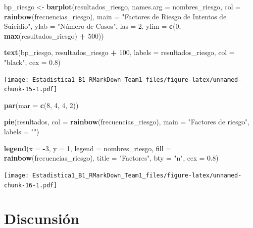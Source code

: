 \documentclass[
]{article}
\newenvironment{Shaded}{\begin{snugshade}}{\end{snugshade}}
\newcommand{\AttributeTok}[1]{\textcolor[rgb]{0.13,0.29,0.53}{#1}}
\newcommand{\DecValTok}[1]{\textcolor[rgb]{0.00,0.00,0.81}{#1}}
\newcommand{\FloatTok}[1]{\textcolor[rgb]{0.00,0.00,0.81}{#1}}
\newcommand{\FunctionTok}[1]{\textcolor[rgb]{0.13,0.29,0.53}{\textbf{#1}}}
\newcommand{\NormalTok}[1]{#1}
\newcommand{\OtherTok}[1]{\textcolor[rgb]{0.56,0.35,0.01}{#1}}
\newcommand{\SpecialCharTok}[1]{\textcolor[rgb]{0.81,0.36,0.00}{\textbf{#1}}}
\newcommand{\StringTok}[1]{\textcolor[rgb]{0.31,0.60,0.02}{#1}}
\begin{document}
\begin{Shaded}
\begin{Highlighting}[]
\NormalTok{bp\_riesgo }\OtherTok{\textless{}{-}} \FunctionTok{barplot}\NormalTok{(resultados\_riesgo, }\AttributeTok{names.arg =}\NormalTok{ nombres\_riesgo, }\AttributeTok{col =} \FunctionTok{rainbow}\NormalTok{(frecuencias\_riesgo), }\AttributeTok{main =} \StringTok{"Factores de Riesgo de Intentos de Suicidio"}\NormalTok{, }\AttributeTok{ylab =} \StringTok{"Número de Casos"}\NormalTok{, }\AttributeTok{las =} \DecValTok{2}\NormalTok{, }\AttributeTok{ylim =} \FunctionTok{c}\NormalTok{(}\DecValTok{0}\NormalTok{, }\FunctionTok{max}\NormalTok{(resultados\_riesgo) }\SpecialCharTok{+} \DecValTok{500}\NormalTok{))}

\FunctionTok{text}\NormalTok{(bp\_riesgo, resultados\_riesgo }\SpecialCharTok{+} \DecValTok{100}\NormalTok{, }\AttributeTok{labels =}\NormalTok{ resultados\_riesgo, }\AttributeTok{col =} \StringTok{"black"}\NormalTok{, }\AttributeTok{cex =} \FloatTok{0.8}\NormalTok{)}
\end{Highlighting}
\end{Shaded}

\texttt{[image: Estadistica1\_B1\_RMarkDown\_Team1\_files/figure-latex/unnamed-chunk-15-1.pdf]}

\begin{Shaded}
\begin{Highlighting}[]
\FunctionTok{par}\NormalTok{(}\AttributeTok{mar =} \FunctionTok{c}\NormalTok{(}\DecValTok{8}\NormalTok{, }\DecValTok{4}\NormalTok{, }\DecValTok{4}\NormalTok{, }\DecValTok{2}\NormalTok{))}

\FunctionTok{pie}\NormalTok{(resultados, }\AttributeTok{col =} \FunctionTok{rainbow}\NormalTok{(frecuencias\_riesgo), }\AttributeTok{main =} \StringTok{"Factores de riesgo"}\NormalTok{, }\AttributeTok{labels =} \StringTok{""}\NormalTok{)}

\FunctionTok{legend}\NormalTok{(}\AttributeTok{x =} \SpecialCharTok{{-}}\DecValTok{3}\NormalTok{, }\AttributeTok{y =} \DecValTok{1}\NormalTok{, }\AttributeTok{legend =}\NormalTok{ nombres\_riesgo, }\AttributeTok{fill =} \FunctionTok{rainbow}\NormalTok{(frecuencias\_riesgo), }\AttributeTok{title =} \StringTok{"Factores"}\NormalTok{, }\AttributeTok{bty =} \StringTok{"n"}\NormalTok{, }\AttributeTok{cex =} \FloatTok{0.8}\NormalTok{)}
\end{Highlighting}
\end{Shaded}

\texttt{[image: Estadistica1\_B1\_RMarkDown\_Team1\_files/figure-latex/unnamed-chunk-16-1.pdf]}

\section{\texorpdfstring{\textbf{Discunsión}}{Discunsión}}\label{discunsiuxf3n}
\end{document}
